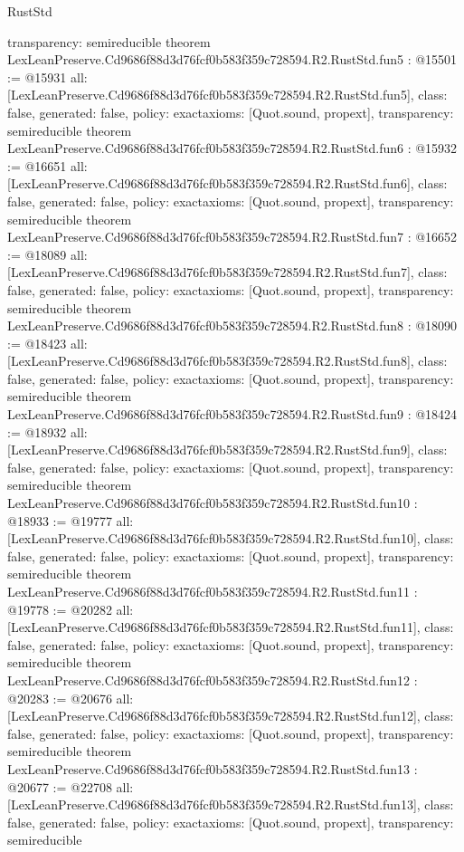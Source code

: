 \begin{lexlean}{RustStd}
\begin{coremodule}
{  transparency: semireducible
}
theorem LexLeanPreserve.Cd9686f88d3d76fcf0b583f359c728594.R2.RustStd.fun5 : @15501 := @15931 {
  all: [LexLeanPreserve.Cd9686f88d3d76fcf0b583f359c728594.R2.RustStd.fun5],
  class: false,
  generated: false,
  policy: exact{axioms: [Quot.sound, propext]},
  transparency: semireducible
}
theorem LexLeanPreserve.Cd9686f88d3d76fcf0b583f359c728594.R2.RustStd.fun6 : @15932 := @16651 {
  all: [LexLeanPreserve.Cd9686f88d3d76fcf0b583f359c728594.R2.RustStd.fun6],
  class: false,
  generated: false,
  policy: exact{axioms: [Quot.sound, propext]},
  transparency: semireducible
}
theorem LexLeanPreserve.Cd9686f88d3d76fcf0b583f359c728594.R2.RustStd.fun7 : @16652 := @18089 {
  all: [LexLeanPreserve.Cd9686f88d3d76fcf0b583f359c728594.R2.RustStd.fun7],
  class: false,
  generated: false,
  policy: exact{axioms: [Quot.sound, propext]},
  transparency: semireducible
}
theorem LexLeanPreserve.Cd9686f88d3d76fcf0b583f359c728594.R2.RustStd.fun8 : @18090 := @18423 {
  all: [LexLeanPreserve.Cd9686f88d3d76fcf0b583f359c728594.R2.RustStd.fun8],
  class: false,
  generated: false,
  policy: exact{axioms: [Quot.sound, propext]},
  transparency: semireducible
}
theorem LexLeanPreserve.Cd9686f88d3d76fcf0b583f359c728594.R2.RustStd.fun9 : @18424 := @18932 {
  all: [LexLeanPreserve.Cd9686f88d3d76fcf0b583f359c728594.R2.RustStd.fun9],
  class: false,
  generated: false,
  policy: exact{axioms: [Quot.sound, propext]},
  transparency: semireducible
}
theorem LexLeanPreserve.Cd9686f88d3d76fcf0b583f359c728594.R2.RustStd.fun10 : @18933 := @19777 {
  all: [LexLeanPreserve.Cd9686f88d3d76fcf0b583f359c728594.R2.RustStd.fun10],
  class: false,
  generated: false,
  policy: exact{axioms: [Quot.sound, propext]},
  transparency: semireducible
}
theorem LexLeanPreserve.Cd9686f88d3d76fcf0b583f359c728594.R2.RustStd.fun11 : @19778 := @20282 {
  all: [LexLeanPreserve.Cd9686f88d3d76fcf0b583f359c728594.R2.RustStd.fun11],
  class: false,
  generated: false,
  policy: exact{axioms: [Quot.sound, propext]},
  transparency: semireducible
}
theorem LexLeanPreserve.Cd9686f88d3d76fcf0b583f359c728594.R2.RustStd.fun12 : @20283 := @20676 {
  all: [LexLeanPreserve.Cd9686f88d3d76fcf0b583f359c728594.R2.RustStd.fun12],
  class: false,
  generated: false,
  policy: exact{axioms: [Quot.sound, propext]},
  transparency: semireducible
}
theorem LexLeanPreserve.Cd9686f88d3d76fcf0b583f359c728594.R2.RustStd.fun13 : @20677 := @22708 {
  all: [LexLeanPreserve.Cd9686f88d3d76fcf0b583f359c728594.R2.RustStd.fun13],
  class: false,
  generated: false,
  policy: exact{axioms: [Quot.sound, propext]},
  transparency: semireducible
}
\end{coremodule}
\end{lexlean}
